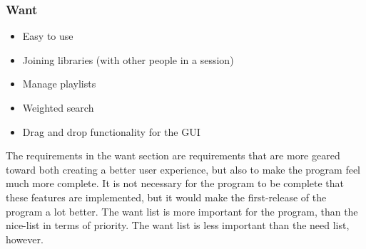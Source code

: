 \subsubsection{Want}


\begin{itemize}
	\item Easy to use 
	\item Joining libraries (with other people in a session)
	\item Manage playlists
	\item Weighted search
	\item Drag and drop functionality for the GUI
\end{itemize}


The requirements in the want section are requirements that are more geared toward both creating a better user experience, but also to make the program feel much more complete. It is not necessary for the program to be complete that these features are implemented, but it would make the first-release of the program a lot better. The want list is more important for the program, than the nice-list in terms of priority. The want list is less important than the need list, however.